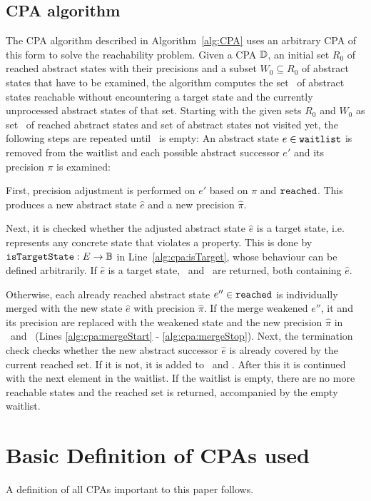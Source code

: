 \subsection{CPA algorithm}
The CPA algorithm described in Algorithm~\ref{alg:CPA} uses an arbitrary CPA of this form to solve the reachability problem.
Given a CPA $\mathbb{D}$, an initial set $R_0$ of reached abstract states with their precisions and a subset $W_0 \subseteq R_0$ of abstract states that have to be examined,
the algorithm computes the set \reachedSet\ of abstract states reachable without encountering a target state and the currently unprocessed abstract states of that set.
Starting with the given sets $R_0$ and $W_0$ as set \reachedSet\ of reached abstract states and set \waitlistSet of abstract states not visited yet, the following steps are repeated until \waitlistSet\ is empty:
An abstract state $e \in \texttt{waitlist}$ is removed from the waitlist and each possible abstract successor $e'$ and its precision $\pi$ is examined:

First, precision adjustment is performed on $e'$ based on $\pi$ and $\texttt{reached}$. This produces a new abstract state $\hat{e}$ and a new precision $\hat{\pi}$.

Next, it is checked whether the adjusted abstract state $\hat{e}$ is a target state, i.e. represents any concrete state that violates a property. This is done by $\texttt{isTargetState} : E \rightarrow \mathbb{B}$ in Line~\ref{alg:cpa:isTarget}, whose behaviour can be defined arbitrarily.
If $\hat{e}$ is a target state, \reachedSet\ and \waitlistSet\ are returned, both containing $\hat{e}$.

Otherwise, each already reached abstract state $e'' \in \texttt{reached}$ is individually merged with the new state $\hat{e}$ with precision $\hat{\pi}$. If the merge weakened $e''$, it and its precision are replaced with the weakened state and the new precision $\hat{\pi}$ in \reachedSet\ and \waitlistSet\ (Lines \ref{alg:cpa:mergeStart} - \ref{alg:cpa:mergeStop}).
Next, the termination check checks whether the new abstract successor $\hat{e}$ is already covered by the current reached set.
If it is not, it is added to \waitlistSet\ and \reachedSet.
After this it is continued with the next element in the waitlist.
If the waitlist is empty, there are no more reachable states and the reached set is returned, accompanied by the empty waitlist.

\section{Basic Definition of CPAs used}
A definition of all CPAs important to this paper follows.

